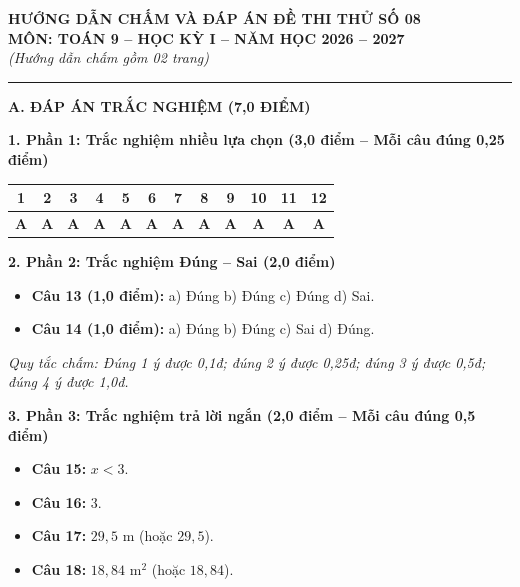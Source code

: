 \documentclass[11pt,a4paper]{article}
\begin{document}
\begin{center}
\textbf{\large HƯỚNG DẪN CHẤM VÀ ĐÁP ÁN ĐỀ THI THỬ SỐ 08}\\
\textbf{MÔN: TOÁN 9 -- HỌC KỲ I -- NĂM HỌC 2026 -- 2027}\\
\textit{(Hướng dẫn chấm gồm 02 trang)}
\end{center}

\vspace{1mm}
\noindent
\rule{\linewidth}{0.8pt}

\vspace{2mm}
\noindent
\textbf{\large A. ĐÁP ÁN TRẮC NGHIỆM (7,0 ĐIỂM)}

\vspace{2mm}
\noindent
\textbf{1. Phần 1: Trắc nghiệm nhiều lựa chọn (3,0 điểm -- Mỗi câu đúng 0,25 điểm)}
\begin{center}
\begin{tabular}{|c|c|c|c|c|c|c|c|c|c|c|c|}
\hline
\textbf{1} & \textbf{2} & \textbf{3} & \textbf{4} & \textbf{5} & \textbf{6} & \textbf{7} & \textbf{8} & \textbf{9} & \textbf{10} & \textbf{11} & \textbf{12} \\
\hline
\textbf{A} & \textbf{A} & \textbf{A} & \textbf{A} & \textbf{A} & \textbf{A} & \textbf{A} & \textbf{A} & \textbf{A} & \textbf{A} & \textbf{A} & \textbf{A} \\
\hline
\end{tabular}
\end{center}

\vspace{2mm}
\noindent
\textbf{2. Phần 2: Trắc nghiệm Đúng -- Sai (2,0 điểm)}
\begin{itemize}
  \item \textbf{Câu 13 (1,0 điểm):} a) Đúng \quad b) Đúng \quad c) Đúng \quad d) Sai.
  \item \textbf{Câu 14 (1,0 điểm):} a) Đúng \quad b) Đúng \quad c) Sai \quad d) Đúng.
\end{itemize}
\textit{Quy tắc chấm: Đúng 1 ý được 0,1đ; đúng 2 ý được 0,25đ; đúng 3 ý được 0,5đ; đúng 4 ý được 1,0đ.}

\vspace{2mm}
\noindent
\textbf{3. Phần 3: Trắc nghiệm trả lời ngắn (2,0 điểm -- Mỗi câu đúng 0,5 điểm)}
\begin{itemize}
  \item \textbf{Câu 15:} $x < 3$.
  \item \textbf{Câu 16:} $3$.
  \item \textbf{Câu 17:} $29{,}5\text{ m}$ (hoặc $29{,}5$).
  \item \textbf{Câu 18:} $18{,}84\text{ m}^2$ (hoặc $18{,}84$).
\end{itemize}
\end{document}
